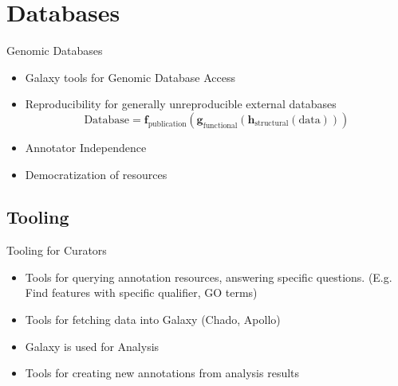 \documentclass[12pt]{phage3slides} %
\begin{document}
\section{Databases}

\begin{frame}{Genomic Databases}
    \begin{itemize}
        \item Galaxy tools for Genomic Database Access
        \item Reproducibility for generally unreproducible external databases\\
            \begin{equation*}
                \text{Database} = %
                    \textbf{f}_{\text{publication}}(%
                    \textbf{g}_{\text{functional}}(%
                    \textbf{h}_{\text{structural}}(%
                    \text{data}%
                    )))
            \end{equation*}
        \item Annotator Independence
        \item Democratization of resources%
    \end{itemize}
\end{frame}

\subsection{Tooling}
\begin{frame}{Tooling for Curators}
    \begin{itemize}
        \item Tools for querying annotation resources, answering specific questions. (E.g. Find features with specific qualifier, GO terms)
        \item Tools for fetching data into Galaxy (Chado, Apollo)
        \item Galaxy is used for Analysis
        \item Tools for creating new annotations from analysis results
    \end{itemize}
\end{frame}
\end{document}
